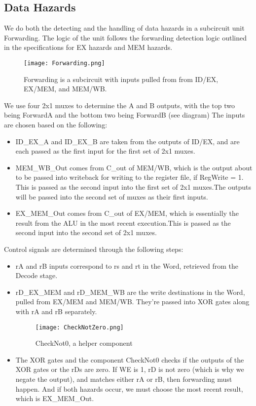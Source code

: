 \documentclass[10pt]{article}
\begin{document}
\subsection{Data Hazards}
We do both the detecting and the handling of data hazards in a subcircuit unit Forwarding. The logic of the unit follows the forwarding detection logic outlined in the specifications for EX hazards and MEM hazards.
\begin{figure}[h]
    \texttt{[image: Forwarding.png]}
    \caption{Forwarding is a subcircuit with inputs pulled from from ID/EX, EX/MEM, and MEM/WB.}
\end{figure}
\newline We use four 2x1 muxes to determine the A and B outputs, with the top two being ForwardA and the bottom two being ForwardB (see diagram) The inputs are chosen based on the following:
\begin{itemize}
    \item ID\_EX\_A and ID\_EX\_B are taken from the outputs of ID/EX, and are each passed as the first input for the first set of 2x1 muxes.
    \item MEM\_WB\_Out comes from C\_out of MEM/WB, which is the output about to be passed into writeback for writing to the register file, if RegWrite = 1. This is passed as the second input into the first set of 2x1 muxes.The outputs will be passed into the second set of muxes as their first inputs.
    \item EX\_MEM\_Out comes from C\_out of EX/MEM, which is essentially the result from the ALU in the most recent execution.This is passed as the second input into the second set of 2x1 muxes.
\end{itemize}
Control signals are determined through the following steps:
\begin{itemize}
    \item rA and rB inputs correspond to rs and rt in the Word, retrieved from the Decode stage.
    \item rD\_EX\_MEM and rD\_MEM\_WB are the write destinations in the Word, pulled from EX/MEM and MEM/WB. They're passed into XOR gates along with rA and rB separately. 
    \begin{figure}[h]
    \texttt{[image: CheckNotZero.png]}
    \caption{CheckNot0, a helper component}
    \end{figure}
    \item The XOR gates and the component CheckNot0 checks if the outputs of the XOR gates or the rDs are zero. If WE is 1, rD is not zero (which is why we negate the output), and matches either rA or rB, then forwarding must happen. And if both hazards occur, we must choose the most recent result, which is EX\_MEM\_Out.
\end{itemize}
\end{document}
